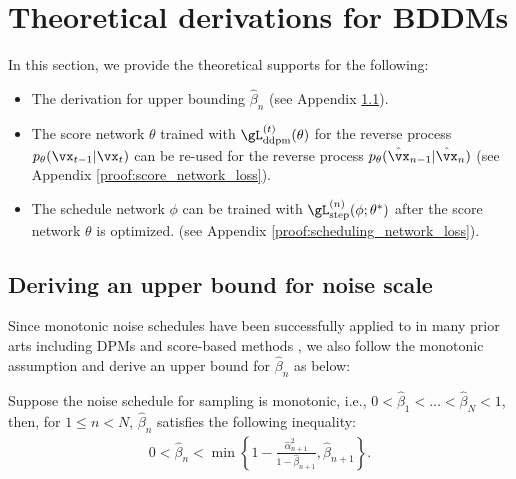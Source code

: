 \newpage
\appendix
\section{Theoretical derivations for BDDMs}
\label{appendix:A}

In this section, we provide the theoretical supports for the following:
\begin{itemize}
    \item The derivation for upper bounding $\hat{\beta}_n$ (see Appendix \ref{proof:upper_bound}).
    \item The score network $\theta$ trained with $\gL^{(t)}_\text{ddpm}(\theta)$ for the reverse process $p_\theta(\vx_{t-1}|\vx_{t})$ can be re-used for the reverse process $p_\theta(\hat{\vx}_{n-1}|\hat{\vx}_n)$ (see Appendix \ref{proof:score_network_loss}).
    \item The schedule network $\phi$ can be trained with $\gL^{(n)}_\text{step}(\phi;\theta^{*})$ after the score network $\theta$ is optimized. (see Appendix \ref{proof:scheduling_network_loss}).
\end{itemize}

\subsection{Deriving an upper bound for noise scale}
\label{proof:upper_bound}
Since monotonic noise schedules have been successfully applied to in many prior arts including DPMs \citep{ho2020denoising,kingma2021variational} and score-based methods \citep{yang2020, yang2020improved}, we also follow the monotonic assumption and derive an upper bound for $\hat{\beta}_{n}$ as below: 
\begin{customRemark}{1}
Suppose the noise schedule for sampling is monotonic, i.e., $0<\hat{\beta}_{1}<\dotsc < \hat{\beta}_{N}<1$, then, for $1\leq n < N$, $\hat{\beta}_{n}$ satisfies the following inequality:
\begin{align}
     0 < \hat{\beta}_{n} < \min\left\{1 - \frac{\hat{\alpha}_{n+1}^2}{1-\hat{\beta}_{n+1}}, \hat{\beta}_{n+1}\right\}.
\end{align}
\end{customRemark}

